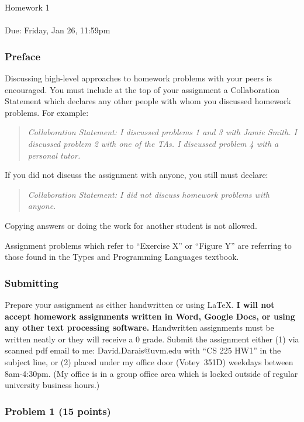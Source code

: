 \documentclass{article}
\begin{document}
\thispagestyle{fancy}
\begin{center}
 \Large{Homework 1} \\ \ \\ \normalsize{Due: Friday, Jan 26, 11:59pm}
\end{center}

\subsubsection*{Preface}

Discussing high-level approaches to homework problems with your peers is
encouraged. You must include at the top of your assignment a Collaboration
Statement which declares any other people with whom you discussed homework
problems. For example:
\begin{quote}\em
  Collaboration Statement: I discussed problems 1 and 3 with Jamie Smith. I
  discussed problem 2 with one of the TAs. I discussed problem 4 with a
  personal tutor.
\end{quote}
If you did not discuss the assignment with anyone, you still must declare:
\begin{quote}\em
  Collaboration Statement: I did not discuss homework problems with anyone.
\end{quote}
Copying answers or doing the work for another student is not allowed.

Assignment problems which refer to ``Exercise X'' or ``Figure Y'' are referring
to those found in the Types and Programming Languages textbook.

\subsubsection*{Submitting}

Prepare your assignment as either handwritten or using LaTeX. \textbf{I will
not accept homework assignments written in Word, Google Docs, or using any
other text processing software.} Handwritten assignments must be written neatly
or they will receive a 0 grade. Submit the assignment either (1) via scanned
pdf email to me: David.Darais@uvm.edu with ``CS 225 HW1'' in the subject line,
or (2) placed under my office door (Votey~351D) weekdays between 8am-4:30pm.
(My office is in a group office area which is locked outside of regular
university business hours.)

\subsubsection*{Problem 1 (15 points)}
\end{document}
